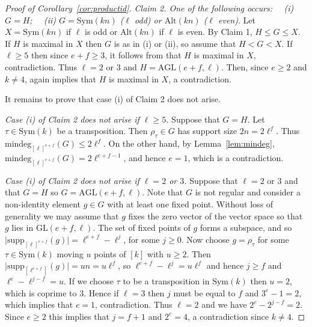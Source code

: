 \documentclass[12pt]{amsart}
\theoremstyle{remark}
\theoremstyle{definition}
\newcommand{\sym}{\mathrm{Sym}}
\newcommand{\alt}{\mathrm{Alt}}
\newcommand{\GL}{\mathrm{GL}}
\newcommand{\AGL}{\mathrm{AGL}}
\newcommand{\supp}{\mathrm{supp}}
\begin{document}
\begin{proof}[Proof of Corollary~\ref{cor:productid}]
\smallskip\noindent
\emph{Claim 2. One of the following occurs: \ \ (i) $G = H$; \ \ (ii) $G = \sym(kn)$ ($\ell$ odd) or $\alt(kn)$ ($\ell$ even)}.
Let $X = \sym(kn)$ if $\ell$ is odd or $\alt(kn)$ if $\ell$ is even. By Claim 1, $H \leqslant G \leqslant X$. If $H$ is maximal in $X$ then $G$ is as in (i) or (ii), so assume that $H < G < X$. If $\ell \geqslant 5$ then since   $e+f \geqslant 3$, it follows from \cite[Theorem, and Remark 2]{LPSon} that $H$ is maximal in $X$, contradiction. Thus $\ell = 2$ or $3$ and $H=\AGL(e+f,\ell)$. Then, since $e \geqslant 2$ and $k\ne 4$, again \cite[Theorem]{LPSon} implies that $H$ is maximal in $X$, a contradiction.

It remains to prove that case (i) of Claim 2 does not arise.

\smallskip\noindent
\emph{Case (i) of Claim 2 does not arise if $\ell \geqslant 5$.} Suppose that $G = H$. Let $\tau \in \sym(k)$ be a transposition. Then $\rho_\tau \in G$ has support size $2n = 2\ell^f$. Thus $\textrm{mindeg}_{[\ell]^{e+f}}(G) \leqslant 2\ell^f$. On the other hand, by Lemma~\ref{lem:mindeg}, $\textrm{mindeg}_{[\ell]^{e+f}}(G) = 2\ell^{e+f-1}$, and hence $e = 1$, which is a contradiction. 
 

\smallskip\noindent
\emph{Case (i) of Claim 2 does not arise if $\ell=2$ or $3$.} Suppose that $\ell = 2$ or $3$ and that $G=H$ so $G = \AGL(e+f,\ell)$. Note that $G$ is not regular and consider a non-identity element $g \in G$ with at least one fixed point. Without loss of generality we may assume that $g$ fixes the zero vector of the vector space so that $g$ lies in  $\GL(e+f,\ell)$. The set of fixed points of $g$ forms a subspace, and so $\big|\supp_{[\ell]^{e+f}}(g)\big| = \ell^{e+f} - \ell^j$, for some $j\geqslant0$. Now choose $g = \rho_\tau$ for some $\tau \in \sym(k) $ moving $u$ points of $[k]$ with $u\geqslant2$. Then $\big|\supp_{[\ell^{e+f}]}(g)\big| = un = u\ell^f$, so $\ell^{e+f}-\ell^j=u\ell^f$ and hence $j\geqslant f$ and $\ell^e - \ell^{j-f}=u$.  If we choose $\tau$ to be a transposition in $\sym(k)$ then $u = 2$, which is coprime to $3$. Hence if $\ell=3$ then $j$ must be equal to $f$ and $3^e - 1 = 2$, which 
implies that $e=1$, contradiction. Thus $\ell=2$ and we have $2^e - 2^{j-f}=2$. Since $e\geqslant2$ this implies that $j=f+1$ and $2^e=4$, a contradiction since $k\ne 4$.
\end{proof}

\end{document}
